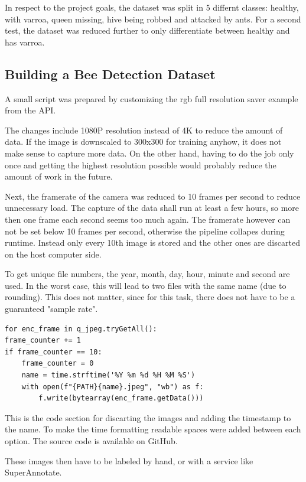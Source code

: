 \documentclass[a4paper,titlepage]{article}
\begin{document}
In respect to the project goals, the dataset was split in 5 differnt classes: healthy, with varroa, queen missing, hive being robbed and attacked by ants.
For a second test, the dataset was reduced further to only differentiate between healthy and has varroa.

\subsection{Building a Bee Detection Dataset}

A small script was prepared by customizing the rgb full resolution saver example from the API.

The changes include 1080P resolution instead of 4K to reduce the amount of data.
If the image is downscaled to 300x300 for training anyhow, it does not make sense to capture more data.
On the other hand, having to do the job only once and getting the highest resolution possible would probably reduce the amount of work in the future.

Next, the framerate of the camera was reduced to 10 frames per second to reduce unnecessary load.
The capture of the data shall run at least a few hours, so more then one frame each second seems too much again.
The framerate however can not be set below 10 frames per second, otherwise the pipeline collapes during runtime.
Instead only every 10th image is stored and the other ones are discarted on the host computer side.

To get unique file numbers, the year, month, day, hour, minute and second are used.
In the worst case, this will lead to two files with the same name (due to rounding).
This does not matter, since for this task, there does not have to be a guaranteed "sample rate".

\begin{lstlisting}
for enc_frame in q_jpeg.tryGetAll():
frame_counter += 1
if frame_counter == 10:
    frame_counter = 0
    name = time.strftime('%Y %m %d %H %M %S')
    with open(f"{PATH}{name}.jpeg", "wb") as f:
        f.write(bytearray(enc_frame.getData()))
\end{lstlisting}

This is the code section for discarting the images and adding the timestamp to the name.
To make the time formatting readable spaces were added between each option.
The source code is available on GitHub.

These images then have to be labeled by hand, or with a service like SuperAnnotate.
\end{document}
